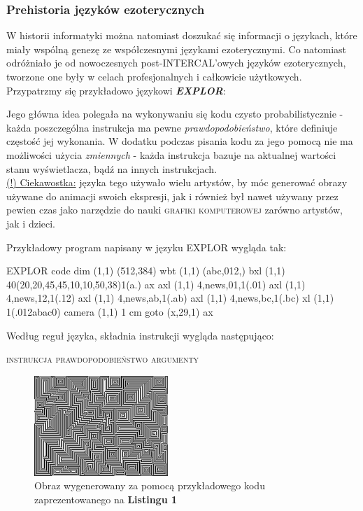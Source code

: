 \documentclass[fleqn,10pt]{SelfArx} %
\begin{document}
\subsubsection{Prehistoria języków ezoterycznych}
W historii informatyki można natomiast doszukać się informacji o językach, 
które miały wspólną genezę ze współczesnymi językami
ezoterycznymi. Co natomiast odróżniało je od nowoczesnych post-INTERCAL'owych języków ezoterycznych, 
tworzone one były w celach profesjonalnych i całkowicie użytkowych.
Przypatrzmy się przykładowo językowi \textbf{\textit{EXPLOR}}: 
\begin{adjustwidth}{1cm}{0cm}
	Jego główna idea polegała na wykonywaniu się kodu czysto probabilistycznie - każda poszczególna instrukcja ma pewne \textit{prawdopodobieństwo}, 
	które definiuje częstość jej wykonania. W dodatku podczas pisania kodu za jego pomocą nie ma możliwości użycia
	\textit{zmiennych} - każda instrukcja bazuje na aktualnej wartości stanu wyświetlacza, bądź na innych instrukcjach.
	\\\underline{\textcolor{darkskyblue}{(!) Ciekawostka:}} języka tego używało wielu artystów, by móc generować obrazy używane do animacji swoich ekspresji, 
	jak i również był nawet używany przez pewien czas jako narzędzie do nauki \textsc{grafiki komputerowej} zarówno artystów, jak i dzieci.
\end{adjustwidth}
Przykładowy program napisany w języku EXPLOR wygląda tak:
\begin{sexylisting}{EXPLOR code}
  dim    (1,1)    (512,384)
  wbt    (1,1)    (abc,012,)
  bxl    (1,1)    40(20,20,45,45,10,10,50,38)1(a.)
ax axl   (1,1)    4,news,01,1(.01)
  axl    (1,1)    4,news,12,1(.12)
  axl    (1,1)    4,news,ab,1(.ab)
  axl    (1,1)    4,news,bc,1(.bc)
  xl     (1,1)    1(.012abac0)
  camera (1,1)    1
cm goto  (x,29,1) ax
\end{sexylisting}
	Według reguł języka, składnia instrukcji wygląda następująco:
	\begin{center}
		\textsc{instrukcja prawdopodobieństwo argumenty}
	\end{center}
\begin{figure}[H] %
	\centering %
	\includegraphics[width=0.45\textwidth]{Figures/Explor_example.png} %
	\caption{Obraz wygenerowany za pomocą przykładowego kodu zaprezentowanego na \textbf{Listingu 1}}
\end{figure}
\end{document}
